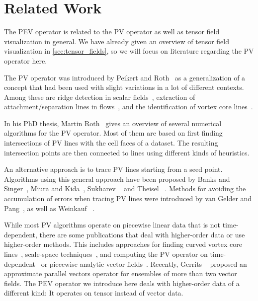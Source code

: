 \section{Related Work} %
\label{sec:pev_related_work}
%
The \ac{PEV} operator is related to the \ac{PV} operator as well as tensor field
visualization in general.
%
We have already given an overview of tensor field visualization in
\cref{sec:tensor_fields}, so we will focus on literature regarding the \ac{PV}
operator here.
%

%
The \ac{PV} operator was introduced by Peikert and Roth~\cite{Peikert1999} as a
generalization of a concept that had been used with slight variations in a lot
of different contexts.
%
Among these are ridge detection in scalar fields~\cite{Haralick1983},
extraction of attachment/separation lines in flows~\cite{Kenwright1999},
and the identification of vortex core lines~\cite{Sujudi1995,Banks1995}.
%

%
In his PhD thesis, Martin Roth~\cite{Roth2000} gives an overview of several
numerical algorithms for the \ac{PV} operator.
%
Most of them are based on first finding intersections of \ac{PV} lines with the
cell faces of a dataset.
%
The resulting intersection points are then connected to lines using different
kinds of heuristics.
%

%
An alternative approach is to trace \ac{PV} lines starting from a seed point.
%
Algorithms using this general approach have been proposed by Banks and
Singer~\cite{Banks1995}, Miura and Kida~\cite{Miura1997}, Sukharev
\etal~\cite{Sukharev2006} and Theisel \etal~\cite{Theisel2003a}.
%
Methods for avoiding the accumulation of errors when tracing \ac{PV} lines were
introduced by van Gelder and Pang~\cite{Gelder2009}, as well as Weinkauf
\etal~\cite{Weinkauf2011}.
%

%
While most \ac{PV} algorithms operate on piecewise linear data that is not
time-dependent, there are some publications that deal with higher-order data
or use higher-order methods.
%
This includes approaches for finding curved vortex core lines~\cite{Roth1998},
scale-space techniques~\cite{Bauer2002}, and computing the \ac{PV} operator on
time-dependent~\cite{Theisel2005,Fuchs2007} or piecewise analytic vector
fields~\cite{Pagot2011}.
%
Recently, Gerrits \etal~\cite{Gerrits2018} proposed an approximate parallel
vectors operator for ensembles of more than two vector fields.
%
The \ac{PEV} operator we introduce here deals with higher-order data of a
different kind: It operates on tensor instead of vector data.
%
